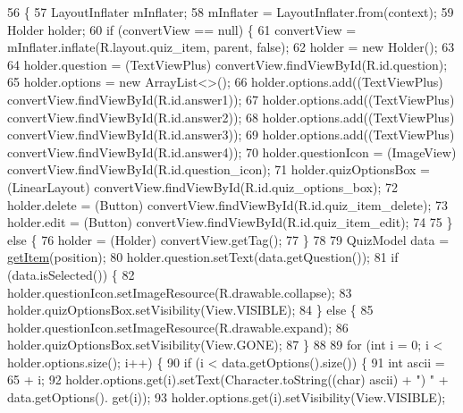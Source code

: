 \begin{DoxyCode}
56                                                                                 \{
57         LayoutInflater mInflater;
58         mInflater = LayoutInflater.from(context);
59         Holder holder;
60         \textcolor{keywordflow}{if} (convertView == null) \{
61             convertView = mInflater.inflate(R.layout.quiz\_item, parent, \textcolor{keyword}{false});
62             holder = \textcolor{keyword}{new} Holder();
63 
64             holder.question = (TextViewPlus) convertView.findViewById(R.id.question);
65             holder.options = \textcolor{keyword}{new} ArrayList<>();
66             holder.options.add((TextViewPlus) convertView.findViewById(R.id.answer1));
67             holder.options.add((TextViewPlus) convertView.findViewById(R.id.answer2));
68             holder.options.add((TextViewPlus) convertView.findViewById(R.id.answer3));
69             holder.options.add((TextViewPlus) convertView.findViewById(R.id.answer4));
70             holder.questionIcon = (ImageView) convertView.findViewById(R.id.question\_icon);
71             holder.quizOptionsBox = (LinearLayout) convertView.findViewById(R.id.quiz\_options\_box);
72             holder.delete = (Button) convertView.findViewById(R.id.quiz\_item\_delete);
73             holder.edit = (Button) convertView.findViewById(R.id.quiz\_item\_edit);
74 
75         \} \textcolor{keywordflow}{else} \{
76             holder = (Holder) convertView.getTag();
77         \}
78 
79         QuizModel data = \hyperlink{classorg_1_1buildmlearn_1_1toolkit_1_1templates_1_1QuizAdapter_add9307def1c611fefc1d255724488c1a}{getItem}(position);
80         holder.question.setText(data.getQuestion());
81         \textcolor{keywordflow}{if} (data.isSelected()) \{
82             holder.questionIcon.setImageResource(R.drawable.collapse);
83             holder.quizOptionsBox.setVisibility(View.VISIBLE);
84         \} \textcolor{keywordflow}{else} \{
85             holder.questionIcon.setImageResource(R.drawable.expand);
86             holder.quizOptionsBox.setVisibility(View.GONE);
87         \}
88 
89         \textcolor{keywordflow}{for} (\textcolor{keywordtype}{int} i = 0; i < holder.options.size(); i++) \{
90             \textcolor{keywordflow}{if} (i < data.getOptions().size()) \{
91                 \textcolor{keywordtype}{int} ascii = 65 + i;
92                 holder.options.get(i).setText(Character.toString((\textcolor{keywordtype}{char}) ascii) + \textcolor{stringliteral}{")  "} + data.getOptions().\textcolor{keyword}{
      get}(i));
93                 holder.options.get(i).setVisibility(View.VISIBLE);

\end{DoxyCode}
